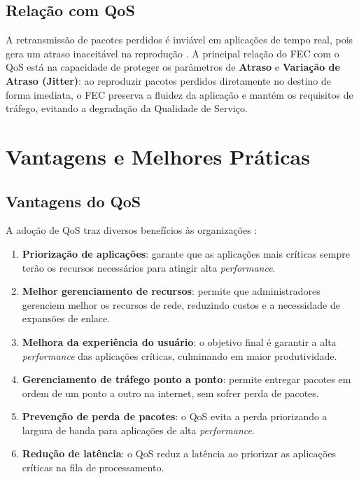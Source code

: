 \subsection{Relação com QoS}

A retransmissão de pacotes perdidos é inviável em aplicações de tempo real, pois
gera um atraso inaceitável na reprodução \cite{geeksforgeeksfec2024}. A principal
relação do FEC com o QoS está na capacidade de proteger os parâmetros de
\textbf{Atraso} e \textbf{Variação de Atraso (Jitter)}: ao reproduzir pacotes
perdidos diretamente no destino de forma imediata, o FEC preserva a fluidez da
aplicação e mantém os requisitos de tráfego, evitando a degradação da Qualidade
de Serviço.

\section{Vantagens e Melhores Práticas}

\subsection{Vantagens do QoS}

A adoção de QoS traz diversos benefícios às organizações \cite{fortinet2024}:

\begin{enumerate}
  \item \textbf{Priorização de aplicações}: garante que as aplicações mais
  críticas sempre terão os recursos necessários para atingir alta
  \textit{performance}.
  \item \textbf{Melhor gerenciamento de recursos}: permite que administradores
  gerenciem melhor os recursos de rede, reduzindo custos e a necessidade de
  expansões de enlace.
  \item \textbf{Melhora da experiência do usuário}: o objetivo final é garantir a
  alta \textit{performance} das aplicações críticas, culminando em maior
  produtividade.
  \item \textbf{Gerenciamento de tráfego ponto a ponto}: permite entregar pacotes
  em ordem de um ponto a outro na internet, sem sofrer perda de pacotes.
  \item \textbf{Prevenção de perda de pacotes}: o QoS evita a perda priorizando a
  largura de banda para aplicações de alta \textit{performance}.
  \item \textbf{Redução de latência}: o QoS reduz a latência ao priorizar as
  aplicações críticas na fila de processamento.
\end{enumerate}

